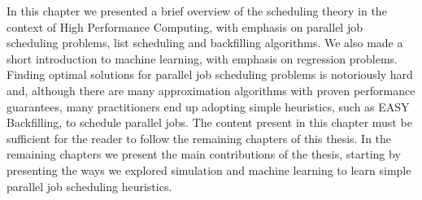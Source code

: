 In this chapter we presented a brief overview of the scheduling theory in the context of High Performance Computing, with emphasis on parallel job scheduling problems, list scheduling and backfilling algorithms. We also made a short introduction to machine learning, with emphasis on regression problems. Finding optimal solutions for parallel job scheduling problems is notoriously hard and, although there are many approximation algorithms with proven performance guarantees, many practitioners end up adopting simple heuristics, such as EASY Backfilling, to schedule parallel jobs. The content present in this chapter must be sufficient for the reader to follow the remaining chapters of this thesis. In the remaining chapters we present the main contributions of the thesis, starting by presenting the ways we explored simulation and machine learning to learn simple parallel job scheduling heuristics. 